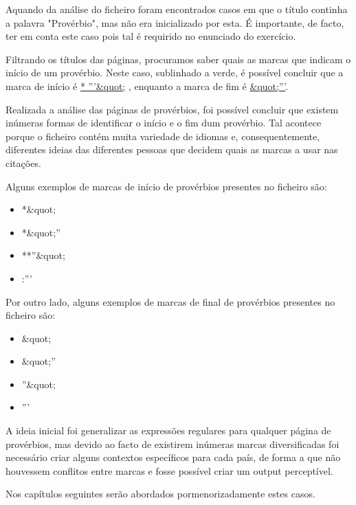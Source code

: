 \documentclass[11pt,a4paper]{report}
\begin{document}
Aquando da análise do ficheiro foram encontrados casos em que o título continha a palavra "Provérbio", mas não era inicializado por esta. É importante, de facto, ter em conta este caso pois tal é requirido no enunciado do exercício.

Filtrando os títulos das páginas, procuramos saber quais as marcas que indicam o início de um provérbio. Neste caso, sublinhado a verde, é possível concluir que a marca de início é \underline{* '''\&quot;} , enquanto a marca de fim é \underline{\&quot;'''}.

Realizada a análise das páginas de provérbios, foi possível concluir que existem inúmeras formas de identificar o início e o fim dum provérbio. Tal acontece porque o ficheiro contém muita variedade de idiomas e, consequentemente, diferentes ideias das diferentes pessoas que decidem quais as marcas a usar nas citações.

	\vspace{0.2cm}

Alguns exemplos de marcas de início de provérbios presentes no ficheiro são:
\begin{itemize}
 \item *\&quot;
 \item *\&quot;''
 \item **''\&quot;
 \item :'''
\end{itemize}

	\vspace{0.2cm}

Por outro lado, alguns exemplos de marcas de final de provérbios presentes no ficheiro são:
\begin{itemize}
 \item \&quot;
 \item \&quot;''
 \item ''\&quot;
 \item '''
\end{itemize}

	\vspace{0.2cm}

A ideia inicial foi generalizar as expressões regulares para qualquer página de provérbios, mas devido ao facto de existirem inúmeras marcas diversificadas foi necessário criar alguns contextos específicos para cada país, de forma a que não houvessem conflitos entre marcas e fosse possível criar um output perceptível.

Nos capítulos seguintes serão abordados pormenorizadamente estes casos.
\end{document}
